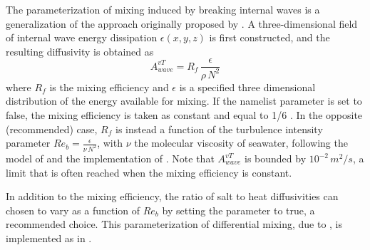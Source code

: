 \documentclass[../tex_main/NEMO_manual]{subfiles}
\begin{document}
%

The parameterization of mixing induced by breaking internal waves is a generalization of
the approach originally proposed by \citet{St_Laurent_al_GRL02}.
A three-dimensional field of internal wave energy dissipation $\epsilon(x,y,z)$ is first constructed,
and the resulting diffusivity is obtained as 
\begin{equation} \label{eq:Kwave}
A^{vT}_{wave} =  R_f \,\frac{ \epsilon }{ \rho \, N^2 }
\end{equation}
where $R_f$ is the mixing efficiency and $\epsilon$ is a specified three dimensional distribution of
the energy available for mixing.
If the  namelist parameter is set to false, the mixing efficiency is taken as constant and
equal to 1/6 \citep{Osborn_JPO80}.
In the opposite (recommended) case, $R_f$ is instead a function of
the turbulence intensity parameter $Re_b = \frac{ \epsilon}{\nu \, N^2}$,
with $\nu$ the molecular viscosity of seawater, following the model of \cite{Bouffard_Boegman_DAO2013} and
the implementation of \cite{de_lavergne_JPO2016_efficiency}.
Note that $A^{vT}_{wave}$ is bounded by $10^{-2}\,m^2/s$, a limit that is often reached when
the mixing efficiency is constant.

In addition to the mixing efficiency, the ratio of salt to heat diffusivities can chosen to vary 
as a function of $Re_b$ by setting the  parameter to true, a recommended choice. 
This parameterization of differential mixing, due to \cite{Jackson_Rehmann_JPO2014},
is implemented as in \cite{de_lavergne_JPO2016_efficiency}.
\end{document}

